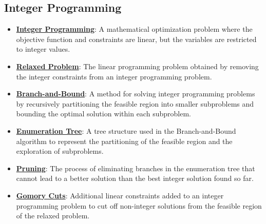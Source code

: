 \documentclass{article}%
\begin{document}
%
\subsection{Integer Programming}%
\label{subsec:IntegerProgramming}%
\begin{itemize}[leftmargin=*]%
\item \href{https://www.math.purdue.edu/~yipn/421//2024-10-31-IntLinProg.pdf#page=1}{\textbf{Integer Programming}}: A mathematical optimization problem where the objective function and constraints are linear, but the variables are restricted to integer values.%
\item \href{https://www.math.purdue.edu/~yipn/421//2024-10-31-IntLinProg.pdf#page=2}{\textbf{Relaxed Problem}}: The linear programming problem obtained by removing the integer constraints from an integer programming problem.%
\item \href{https://www.math.purdue.edu/~yipn/421//2024-10-31-IntLinProg.pdf#page=5}{\textbf{Branch-and-Bound}}: A method for solving integer programming problems by recursively partitioning the feasible region into smaller subproblems and bounding the optimal solution within each subproblem.%
\item \href{https://www.math.purdue.edu/~yipn/421//2024-10-31-IntLinProg.pdf#page=6}{\textbf{Enumeration Tree}}: A tree structure used in the Branch-and-Bound algorithm to represent the partitioning of the feasible region and the exploration of subproblems.%
\item \href{https://www.math.purdue.edu/~yipn/421//2024-10-31-IntLinProg.pdf#page=11}{\textbf{Pruning}}: The process of eliminating branches in the enumeration tree that cannot lead to a better solution than the best integer solution found so far.%
\item \href{https://www.math.purdue.edu/~yipn/421//2024-10-31-IntLinProg.pdf#page=15}{\textbf{Gomory Cuts}}: Additional linear constraints added to an integer programming problem to cut off non-integer solutions from the feasible region of the relaxed problem.%
\end{itemize}

%
\end{document}
